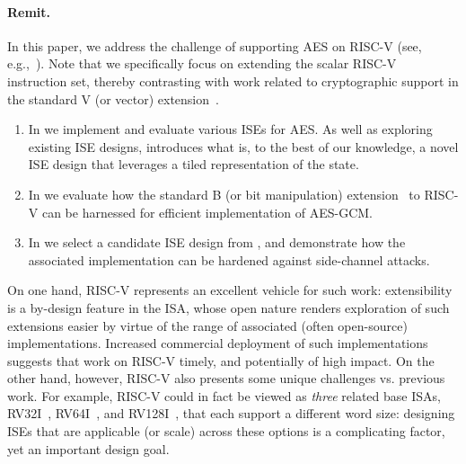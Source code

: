 
\paragraph{Remit.}

In this paper, we address the challenge of supporting AES on RISC-V
(see, e.g.,~\cite{riscv:1,riscv:2}).
Note that we specifically focus on extending the scalar RISC-V instruction 
set, thereby contrasting with work related to cryptographic support in the
standard V 
(or vector) 
extension~\cite[Section 21]{RV:ISA:I:19}.

\begin{enumerate}

\item In 
      we implement and evaluate various ISEs for AES.
      As well as exploring existing ISE designs, 
      introduces what is, to the best of our knowledge, a novel ISE design 
      that leverages a tiled representation of the state.

\item In
      we evaluate how the
      standard B 
      (or bit manipulation) 
      extension~\cite[Section 21]{RV:ISA:I:19}
      to RISC-V can be harnessed for efficient implementation of AES-GCM.

\item In
      we select a candidate ISE design from 
      ,
      and demonstrate how the associated implementation can be hardened
      against side-channel attacks.

\end{enumerate}

\noindent
On one hand, 
RISC-V represents an excellent vehicle for such work:
extensibility is a by-design feature in the ISA, whose open nature renders
exploration of such extensions easier by virtue of the range of associated 
(often open-source) implementations.  
Increased commercial deployment of such implementations suggests that work 
on RISC-V timely, and potentially of high impact.
On the other hand, however,
RISC-V also presents some unique challenges vs. previous work.
For example,
RISC-V could in fact be viewed as {\em three} related base ISAs,
 RV32I~\cite[Section 2]{RV:ISA:I:19},
 RV64I~\cite[Section 5]{RV:ISA:I:19},
and
RV128I~\cite[Section 6]{RV:ISA:I:19},
that each support a different word size:
designing ISEs that are applicable (or scale) across these options is a
complicating factor, yet an important design goal.


